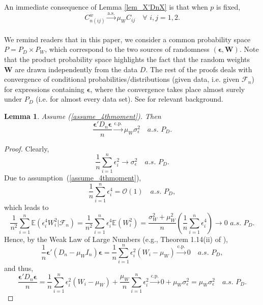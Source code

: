 \documentclass[ejs,authoryear,linksfromyear]{imsart}
\newcommand{\sumin}{\sum_{i=1}^n} %
\newcommand{\CONV}[1]{\stackrel{\text{#1}}{\longrightarrow}} %
\numberwithin{equation}{section}
\theoremstyle{plain}
\newtheorem{lem}{Lemma}[section]
\begin{document}
An immediate consequence of Lemma \ref{lem_X'DnX} is that when $p$ is fixed,
$$
C_{n(ij)}^w \CONV{a.s.} \mu_W C_{ij} \quad \forall \,\, i,j = 1,2.
$$
\\
We remind readers that in this paper, we consider a common probability space $P = P_D \times P_W$, which correspond to the two sources of randomness $(\bm{\epsilon}, \bm{W})$. Note that the product probability space highlights the fact that the random weights $\bm{W}$ are drawn independently from the data $D$. The rest of the proofs deals with convergence of conditional probabilities/distributions (given data, i.e. given $\mathcal{F}_n$) for expressions containing $\bm{\epsilon}$, where the convergence takes place almost surely under $P_D$ (i.e. for almost every data set). See \citet{mason1992rank}  for relevant background.

\begin{lem} \label{lem_EpsDnEps}
	Assume (\ref{assume_4thmoment}). Then
	$$
	\dfrac{\bm{\epsilon}' D_n \bm{\epsilon}}{n}
	\CONV{c.p.} \mu_W \sigma^2_{\epsilon}
	\quad a.s. \,\, P_D.
	$$
\end{lem} 

\begin{proof}
	Clearly, 
	$$
	\dfrac{1}{n} \sumin\epsilon_i^2
	\to \sigma^2_{\epsilon} \quad a.s. \,\, P_D.
	$$
	Due to assumption~(\ref{assume_4thmoment}),
	$$
	\dfrac{1}{n} \sumin \epsilon_i^4 
	= \mathcal{O}(1) 
	\quad a.s. \,\, P_D,
	$$
	which leads to
	$$
	\dfrac{1}{n^2} \sumin  \mathbb{E} (\epsilon_i^4 W_i ^2 \big| \mathcal{F}_n)
	= \dfrac{1}{n^2} \sumin \epsilon_i^4 \mathbb{E} (W_i ^2)
	= \dfrac{\sigma^2_W + \mu_W^2}{n} \left( \dfrac{1}{n} \sumin \epsilon_i^4 \right)
	\to 0 \,\, a.s. \,\, P_D. 
	$$
	Hence, by the Weak Law of Large Numbers (e.g., Theorem 1.14(ii) of \citet{junshao}),
	$$
	\dfrac{1}{n} \bm{\epsilon}' (D_n - \mu_W I_n) \bm{\epsilon}
	= \dfrac{1}{n} \sumin \epsilon_i^2 (W_i - \mu_W)
	\CONV{c.p.} 0 \quad a.s. \,\, P_D,
	$$ 
	and thus,
	$$
	\dfrac{\bm{\epsilon}' D_n \bm{\epsilon}}{n}
	= \dfrac{1}{n} \sumin \epsilon_i^2 (W_i - \mu_W)
	+ \dfrac{\mu_W}{n} \sumin\epsilon_i^2
	\CONV{c.p.} 0 + \mu_W \sigma^2_{\epsilon}
	= \mu_W \sigma^2_{\epsilon} \quad a.s. \,\, P_D.
	$$ 
\end{proof}
\end{document}
